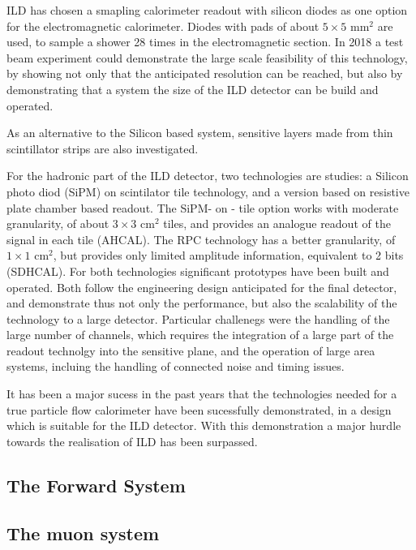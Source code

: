 \documentclass[%
 preprint,
 amsmath,amssymb,
 aps,
]{revtex4-1}
\begin{document}
ILD has chosen a smapling calorimeter readout with silicon diodes as one option for the electromagnetic calorimeter. Diodes with pads of about $5 \times 5$ mm$^2$ are used, to sample a shower 28 times in the electromagnetic section. In 2018 a test beam experiment could demonstrate the large scale feasibility of this technology, by showing not only that the anticipated resolution can be reached, but also by demonstrating that a system the size of the ILD detector can be build and operated. 

As an alternative to the Silicon based system, sensitive layers made from thin scintillator strips are also investigated. 

For the hadronic part of the ILD detector, two technologies are studies: a Silicon photo diod (SiPM) on scintilator tile technology, and a version based on resistive plate chamber based readout. The SiPM- on - tile option works with moderate granularity, of about $3 \times 3$ cm$^2$ tiles, and provides an analogue readout of the signal in each tile (AHCAL). The RPC technology has a better granularity, of $1 \times 1$ cm$^2$, but provides only limited amplitude information, equivalent to 2 bits (SDHCAL). For both technologies significant prototypes have been built and operated. Both follow the engineering design anticipated for the final detector, and demonstrate thus not only the performance, but also the scalability of the technology to a large detector. Particular challenegs were the handling of the large number of channels, which requires the integration of a large part of the readout technolgy into the sensitive plane, and the operation of large area systems, incluing the handling of connected noise and timing issues. 

It has been a major sucess in the past years that the technologies needed for a true particle flow calorimeter have been sucessfully demonstrated, in a design which is suitable for the ILD detector. With this demonstration a major hurdle towards the realisation of ILD has been surpassed. 



\subsection{The Forward System}



\subsection{The muon system}
\end{document}
